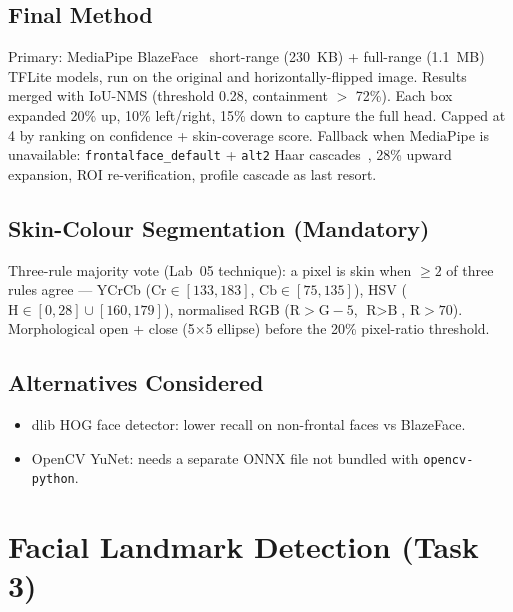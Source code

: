 \documentclass[11pt,a4paper,titlepage]{article}
\begin{document}
\subsection{Final Method}
Primary: MediaPipe BlazeFace~\citep{bazarevsky2019blazeface} short-range (230~KB)
+ full-range (1.1~MB) TFLite models, run on the original and horizontally-flipped
image. Results merged with IoU-NMS (threshold 0.28, containment $>$ 72\%). Each
box expanded 20\% up, 10\% left/right, 15\% down to capture the full head. Capped
at 4 by ranking on confidence + skin-coverage score. Fallback when MediaPipe is
unavailable: \texttt{frontalface\_default} + \texttt{alt2} Haar
cascades~\citep{viola2001rapid}, 28\% upward expansion, ROI re-verification,
profile cascade as last resort.

\subsection{Skin-Colour Segmentation (Mandatory)}
Three-rule majority vote (Lab~05 technique): a pixel is skin when $\geq 2$ of
three rules agree --- YCrCb ($\text{Cr} \in [133, 183]$, $\text{Cb} \in [75, 135]$),
HSV ($\text{H} \in [0,28] \cup [160,179]$), normalised RGB
($\text{R} > \text{G}-5$, $\text{R} > \text{B}$, $\text{R} > 70$). Morphological
open + close (5$\times$5 ellipse) before the 20\% pixel-ratio threshold.

\subsection{Alternatives Considered}
\begin{itemize}
  \item dlib HOG face detector: lower recall on non-frontal faces vs BlazeFace.
  \item OpenCV YuNet: needs a separate ONNX file not bundled with \texttt{opencv-python}.
\end{itemize}

\section{Facial Landmark Detection (Task 3)}
\end{document}
